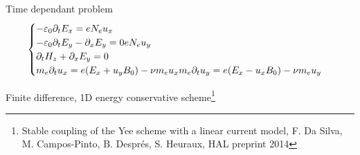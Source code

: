 \begin{frame}{Time dependant problem}
\[
\begin{cases}
- \varepsilon_0 \partial_t E_x = e N_e u_x \\
- \varepsilon_0 \partial_t E_y - \partial_x E_y = 0 e N_e u_y \\
\partial_t H_z + \partial_x E_y = 0 \\
m_e \partial_t u_x = e (E_x + u_y B_0) - \nu m_e u_x
m_e \partial_t u_y = e (E_x - u_x B_0) - \nu m_e u_y
\end{cases}
\]

\alert{Finite difference, 1D energy conservative scheme\footnote{ Stable coupling of the Yee scheme with a linear current model, F. Da Silva, M. Campos-Pinto, B. Després, S. Heuraux, HAL preprint 2014}}


\end{frame}
 {
\begin{frame}
\begin{center}
\textcolor{lightred}{}
\end{center}
\end{frame}}

